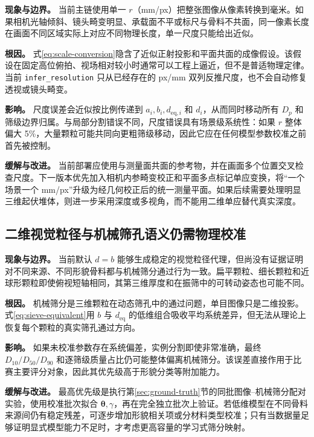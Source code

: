 \textbf{现象与边界。} 当前主链使用单一 $r$（mm/px）把整张图像从像素转换到毫米。如果相机光轴倾斜、镜头畸变明显、承载面不平或标尺与骨料不共面，同一像素长度在画面不同区域实际上对应不同物理长度，单一尺度只能给出近似。

\textbf{根因。} 式\eqref{eq:scale-conversion}隐含了近似正射投影和平面共面的成像假设。该假设在固定高位俯拍、视场相对较小时通常可以工程上逼近，但不是普适物理定律。当前 \texttt{infer\_resolution} 只从已经存在的 px/mm 双列反推尺度，也不会自动修复透视或镜头畸变。

\textbf{影响。} 尺度误差会近似按比例传递到 $a_i,b_i,d_{\mathrm{eq},i}$ 和 $d_i$，从而同时移动所有 $D_p$ 和筛级边界归属。与局部分割错误不同，尺度错误具有场景级系统性：如果 $r$ 整体偏大 5\%，大量颗粒可能共同向更粗筛级移动，因此它应在任何模型参数校准之前首先被控制。

\textbf{缓解与改进。} 当前部署应使用与测量面共面的参考物，并在画面多个位置交叉检查尺度。下一版本优先加入相机内参畸变校正和平面多点标记单应变换，将“一个场景一个 mm/px”升级为经几何校正后的统一测量平面。如果后续需要处理明显三维起伏堆体，则进一步采用深度或多视角，而不能用二维单应替代真实深度。

\subsection{二维视觉粒径与机械筛孔语义仍需物理校准}
\label{sec:limit-sieve-semantics}

\textbf{现象与边界。} 当前默认 $d=b$ 能够生成稳定的视觉粒径代理，但尚没有证据证明对不同来源、不同形貌骨料都与机械筛分通过行为一致。扁平颗粒、细长颗粒和近球形颗粒即使俯视短轴相同，其第三维厚度和在振筛中的可转动姿态也可能不同。

\textbf{根因。} 机械筛分是三维颗粒在动态筛孔中的通过问题，单目图像只是二维投影。式\eqref{eq:sieve-equivalent}用 $b$ 与 $d_{\mathrm{eq}}$ 的低维组合吸收平均系统差异，但无法从理论上恢复每个颗粒的真实筛孔通过方向。

\textbf{影响。} 如果未校准参数存在系统偏差，实例分割即使非常准确，最终 $D_{10}/D_{50}/D_{90}$ 和逐筛级质量占比仍可能整体偏离机械筛分。该误差直接作用于比赛主要评分对象，因此其优先级高于形貌分类等附加能力。

\textbf{缓解与改进。} 最高优先级是执行第\ref{sec:ground-truth}节的同批图像--机械筛分配对实验，使用校准批次拟合 $\boldsymbol{\theta},\gamma$，再在完全独立批次上验证。若低维模型在不同骨料来源间仍有稳定残差，可逐步增加形貌相关项或分材料类型校准；只有当数据量足够证明显式模型能力不足时，才考虑更高容量的学习式筛分映射。

